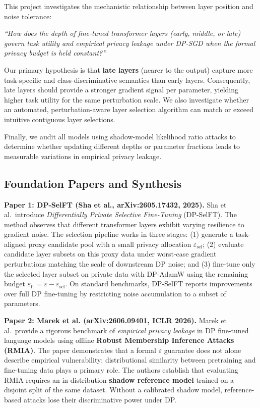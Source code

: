 \documentclass[11pt,a4paper]{article}
\begin{document}
This project investigates the mechanistic relationship between layer position and noise tolerance:

\begin{center}
\emph{``How does the depth of fine-tuned transformer layers (early, middle, or late) govern task utility and empirical privacy leakage under DP-SGD when the formal privacy budget is held constant?''}
\end{center}

Our primary hypothesis is that \textbf{late layers} (nearer to the output) capture more
task-specific and class-discriminative semantics than early layers. Consequently, late layers
should provide a stronger gradient signal per parameter, yielding higher task utility for the
same perturbation scale. We also investigate whether an automated, perturbation-aware layer
selection algorithm can match or exceed intuitive contiguous layer selections.

Finally, we audit all models using shadow-model likelihood ratio attacks to determine whether
updating different depths or parameter fractions leads to measurable variations in empirical
privacy leakage.

\subsection{Foundation Papers and Synthesis}

\textbf{Paper 1: DP-SelFT (Sha et al., arXiv:2605.17432, 2025).}
Sha et al.\ introduce \emph{Differentially Private Selective Fine-Tuning} (DP-SelFT). The
method observes that different transformer layers exhibit varying resilience to gradient noise.
The selection pipeline works in three stages: (1) generate a task-aligned proxy candidate pool
with a small privacy allocation $\varepsilon_{\text{sel}}$; (2) evaluate candidate layer
subsets on this proxy data under worst-case gradient perturbations matching the scale of
downstream DP noise; and (3) fine-tune only the selected layer subset on private data with
DP-AdamW using the remaining budget $\varepsilon_{\text{ft}} = \varepsilon - \varepsilon_{\text{sel}}$.
On standard benchmarks, DP-SelFT reports improvements over full DP fine-tuning by restricting
noise accumulation to a subset of parameters.

\textbf{Paper 2: Marek et al. (arXiv:2606.09401, ICLR 2026).}
Marek et al.\ provide a rigorous benchmark of \emph{empirical privacy leakage} in DP fine-tuned
language models using offline \textbf{Robust Membership Inference Attacks (RMIA)}. The paper
demonstrates that a formal $\varepsilon$ guarantee does not alone describe empirical vulnerability;
distributional similarity between pretraining and fine-tuning data plays a primary role. The
authors establish that evaluating RMIA requires an in-distribution \textbf{shadow reference
model} trained on a disjoint split of the same dataset. Without a calibrated shadow model,
reference-based attacks lose their discriminative power under DP.
\end{document}
